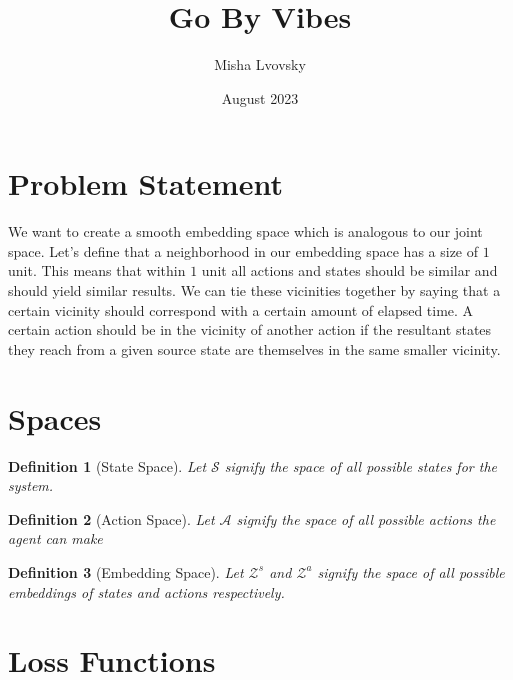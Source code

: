 \documentclass{article}
\title{Go By Vibes}
\author{Misha Lvovsky}
\date{August 2023}
\newtheorem{definition}{Definition}
\begin{document}
\maketitle

\section{Problem Statement}

We want to create a smooth embedding space which is analogous to our joint space.
Let's define that a neighborhood in our embedding space has a size of $1$ unit. This means that within $1$ unit all actions and states should be similar and should yield similar results. We can tie these vicinities together by saying that a certain vicinity should correspond with a certain amount of elapsed time. A certain action should be in the vicinity of another action if the resultant states they reach from a given source state are themselves in the same smaller vicinity.

\section{Spaces}

\begin{definition} [State Space] Let $\mathcal{S}$ signify the space of all possible states for the system.
\end{definition}
\begin{definition} [Action Space]
    Let $\mathcal{A}$ signify the space of all possible actions the agent can make
\end{definition}
\begin{definition} [Embedding Space]
    Let $\mathcal{Z}^s$ and $\mathcal{Z}^a$ signify the space of all possible embeddings of states and actions respectively.
\end{definition}

\section{Loss Functions}
\end{document}
